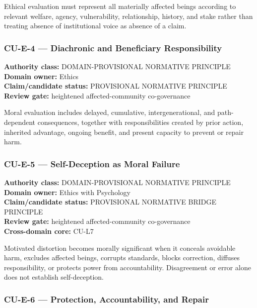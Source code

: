 \documentclass[
  11pt,
]{article}
\begin{document}
Ethical evaluation must represent all materially affected beings
according to relevant welfare, agency, vulnerability, relationship,
history, and stake rather than treating absence of institutional voice
as absence of a claim.

\subsubsection{CU-E-4 --- Diachronic and Beneficiary
Responsibility}\label{cu-e-4-diachronic-and-beneficiary-responsibility}

\textbf{Authority class:} DOMAIN-PROVISIONAL NORMATIVE PRINCIPLE\\
\textbf{Domain owner:} Ethics\\
\textbf{Claim/candidate status:} PROVISIONAL NORMATIVE PRINCIPLE\\
\textbf{Review gate:} heightened affected-community co-governance

Moral evaluation includes delayed, cumulative, intergenerational, and
path-dependent consequences, together with responsibilities created by
prior action, inherited advantage, ongoing benefit, and present capacity
to prevent or repair harm.

\subsubsection{CU-E-5 --- Self-Deception as Moral
Failure}\label{cu-e-5-self-deception-as-moral-failure}

\textbf{Authority class:} DOMAIN-PROVISIONAL NORMATIVE PRINCIPLE\\
\textbf{Domain owner:} Ethics with Psychology\\
\textbf{Claim/candidate status:} PROVISIONAL NORMATIVE BRIDGE
PRINCIPLE\\
\textbf{Review gate:} heightened affected-community co-governance\\
\textbf{Cross-domain core:} CU-L7

Motivated distortion becomes morally significant when it conceals
avoidable harm, excludes affected beings, corrupts standards, blocks
correction, diffuses responsibility, or protects power from
accountability. Disagreement or error alone does not establish
self-deception.

\subsubsection{CU-E-6 --- Protection, Accountability, and
Repair}\label{cu-e-6-protection-accountability-and-repair}
\end{document}
